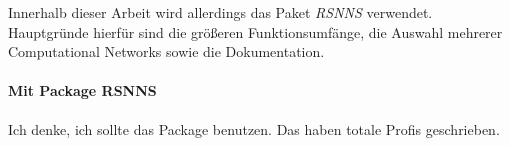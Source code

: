 Innerhalb dieser Arbeit wird allerdings das Paket \textit{RSNNS} verwendet. Hauptgründe hierfür sind die größeren Funktionsumfänge, die Auswahl mehrerer Computational Networks sowie die Dokumentation.
\paragraph{Mit Package RSNNS}
Ich denke, ich sollte das Package benutzen. Das haben totale Profis geschrieben. 

